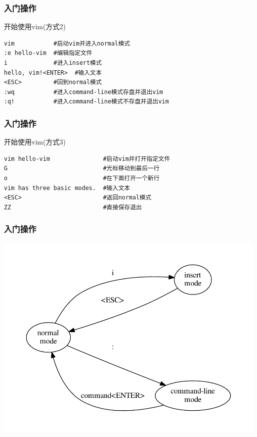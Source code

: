 \documentclass[xcolor=svgnames,presentation]{beamer}
\begin{document}
\begin{frame}[fragile]
\frametitle{入门操作}
\label{sec-4-1-3}
\begin{exampleblock}{开始使用vim(方式2)}
\label{sec-4-1-3-1}


\begin{verbatim}
vim           #启动vim并进入normal模式
:e hello-vim  #编辑指定文件
i             #进入insert模式
hello, vim!<ENTER>  #输入文本
<ESC>         #回到normal模式
:wq           #进入command-line模式存盘并退出vim
:q!           #进入command-line模式不存盘并退出vim
\end{verbatim}
\end{exampleblock}
\end{frame}
\begin{frame}[fragile]
\frametitle{入门操作}
\label{sec-4-1-4}
\begin{exampleblock}{开始使用vim(方式3)}
\label{sec-4-1-4-1}


\begin{verbatim}
vim hello-vim               #启动vim并打开指定文件
G                           #光标移动到最后一行
o                           #在下面打开一个新行
vim has three basic modes.  #输入文本
<ESC>                       #返回normal模式
ZZ                          #直接保存退出
\end{verbatim}
\end{exampleblock}
\end{frame}
\begin{frame}
\frametitle{入门操作}
\label{sec-4-1-5}

\includegraphics[width=.9\linewidth]{img/vimode-basic.pdf}
\end{frame}
\end{document}
